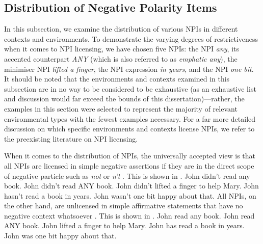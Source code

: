 \subsection{Distribution of Negative Polarity Items}
In this subsection, we examine the distribution of various NPIs in different contexts and environments. To demonstrate the varying degrees of restrictiveness when it comes to NPI licensing, we have chosen five NPIs: the NPI \textit{any}, its accented counterpart \textit{\MakeUppercase{any}} (which is also referred to as \textit{emphatic any}), the minimiser NPI \textit{lifted a finger}, the NPI expression \textit{in years}, and the NPI \textit{one bit}. It should be noted that the environments and contexts examined in this subsection are in no way to be considered to be exhaustive (as an exhaustive list and discussion would far exceed the bounds of this dissertation)---rather, the examples in this section were selected to represent the majority of relevant environmental types with the fewest examples necessary. For a far more detailed discussion on which specific environments and contexts license NPIs, we refer to the preexisting literature on NPI licensing.

When it comes to the distribution of NPIs, the universally accepted view is that all NPIs are licensed in simple negative assertions if they are in the direct scope of negative particle such as \textit{not} or \textit{n't} \parencite[see, amongst many others,][]{Jespersen1917,Klima1964,Baker1969,Baker1970}. This is shown in .
\pex\label{ex:npi-negation}
\a John didn't read any book.
\a John didn't read \MakeUppercase{any} book.
\a John didn't lifted a finger to help Mary.
\a John hasn't read a book in years.
\a John wasn't one bit happy about that.
\xe
All NPIs, on the other hand, are unlicensed in simple affirmative statements that have no negative context whatsoever \parencite[see, amongst many others,][]{Jespersen1917,Klima1964,Baker1969,Baker1970}. This is shown in .
\pex\label{ex:npi-um}
\a\ljudge{\#} John read any book.
\a\ljudge{\#} John read \MakeUppercase{any} book.
\a\ljudge{\#} John lifted a finger to help Mary.
\a\ljudge{\#} John has read a book in years.
\a\ljudge{\#} John was one bit happy about that.
\xe

